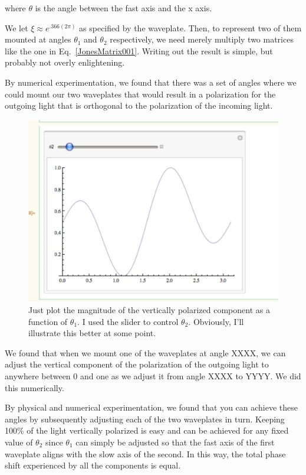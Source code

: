 where $\theta$ is the angle between the fast axis and the x axis. 

We let $\xi\approx e^{.366 (2 \pi)}$ as specified by the waveplate. Then, to represent two of them mounted at angles $\theta_1$ and $\theta_2$ respectively, we need merely multiply two matrices like the one in Eq.\ \ref{JonesMatrix001}. Writing out the result is simple, but probably not overly enlightening. 

By numerical experimentation, we found that there was a set of angles where we could mount our two waveplates that would result in a polarization for the outgoing light that is orthogonal to the polarization of the incoming light. 

\begin{figure}
    \centerline{\includegraphics{numericalMethod}}
    \caption[Numerical method]{\label{fig:numericalLightControlMethod}
    Just plot the magnitude of the vertically polarized component as a function of $\theta_1$. I used the slider to control $\theta_2$. Obviously, I'll illustrate this better at some point.}
\end{figure}

We found that when we mount one of the waveplates at angle XXXX, we can adjust the vertical component of the polarization of the outgoing light to anywhere between 0 and one as we adjust it from angle XXXX to YYYY. We did this numerically. 

By physical and numerical experimentation, we found that you can achieve these angles by subsequently adjusting each of the two waveplates in turn. Keeping 100\% of the light vertically polarized is easy and can be achieved for any fixed value of $\theta_2$ since $\theta_1$ can simply be adjusted so that the fast axis of the first waveplate aligns with the slow axis of the second. In this way, the total phase shift experienced by all the components is equal.

